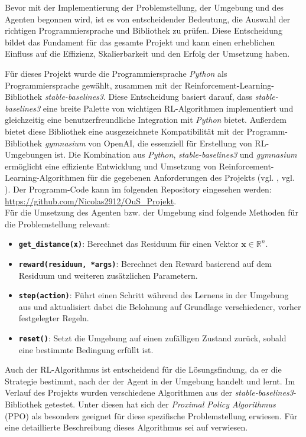 \documentclass{article}
\def\code#1{\texttt{#1}}
\theoremstyle{newline}
\begin{document}
\begin{onehalfspace}
Bevor mit der Implementierung der Problemstellung, der Umgebung und des Agenten begonnen wird, ist es von entscheidender Bedeutung, die Auswahl der richtigen Programmiersprache und Bibliothek zu prüfen. Diese Entscheidung bildet das Fundament für das gesamte Projekt und kann einen erheblichen Einfluss auf die Effizienz, Skalierbarkeit und den Erfolg der Umsetzung haben.
\medskip

Für dieses Projekt wurde die Programmiersprache \textit{Python} als Programmiersprache gewählt, zusammen mit der Reinforcement-Learning-Bibliothek \textit{stable-baselines3}. Diese Entscheidung basiert darauf, dass \textit{stable-baselines3} eine breite Palette von wichtigen RL-Algorithmen implementiert und gleichzeitig eine benutzerfreundliche Integration mit \textit{Python} bietet. Außerdem bietet diese Bibliothek eine ausgezeichnete Kompatibilität mit der Programm-Bibliothek \textit{gymnasium} von OpenAI, die essenziell für Erstellung von RL-Umgebungen ist. Die Kombination aus \textit{Python}, \textit{stable-baselines3} und \textit{gymnasium} ermöglicht eine effiziente Entwicklung und Umsetzung von Reinforcement-Learning-Algorithmen für die gegebenen Anforderungen des Projekts (vgl. \cite{Raffin2021}, vgl. \cite{Towers2023}). Der Programm-Code kann im folgenden Repository eingesehen werden: \url{https://github.com/Nicolas2912/OuS_Projekt}.
\\

Für die Umsetzung des Agenten bzw. der Umgebung sind folgende Methoden für die Problemstellung relevant:

\begin{itemize}
	\item \textbf{\code{get\_distance(x)}}: Berechnet das Residuum für einen Vektor $\mathbf{x} \in \mathbb{R}^{n}$.
	\item \textbf{\code{reward(residuum, *args)}}: Berechnet den Reward basierend auf dem Residuum und weiteren zusätzlichen Parametern.
	\item \textbf{\code{step(action)}}: Führt einen Schritt während des Lernens in der Umgebung aus und aktualisiert dabei die Belohnung auf Grundlage verschiedener, vorher festgelegter Regeln.
	\item \textbf{\code{reset()}}: Setzt die Umgebung auf einen zufälligen Zustand zurück, sobald eine bestimmte Bedingung erfüllt ist.
\end{itemize}
\bigskip

Auch der RL-Algorithmus ist entscheidend für die Lösungsfindung, da er die Strategie bestimmt, nach der der Agent in der Umgebung handelt und lernt. Im Verlauf des Projekts wurden verschiedene Algorithmen aus der \textit{stable-baselines3}-Bibliothek getestet. Unter diesen hat sich der \textit{Proximal Policy Algorithmus} (PPO) als besonders geeignet für diese spezifische Problemstellung erwiesen. Für eine detaillierte Beschreibung dieses Algorithmus sei auf \cite{Schulman2017} verwiesen.
\medskip


\end{onehalfspace}
\end{document}
